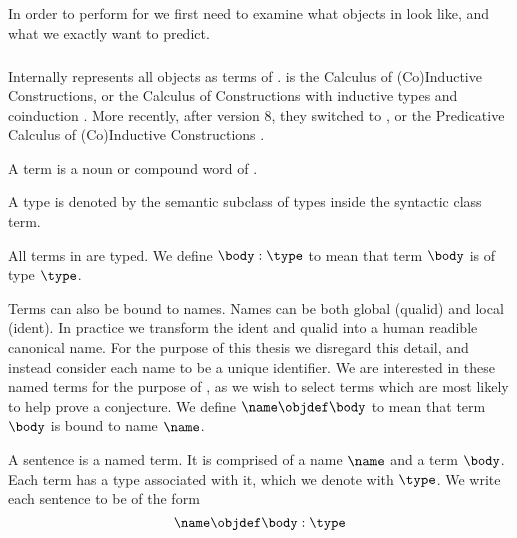 \subsection{\coq}

In order to perform \premiseselection for \coq we first need to examine what objects in \coq look like, and what we exactly want to predict.

\subsubsection{\pcic}

Internally \coq represents all objects as terms  of \cic {}.
\cic is the Calculus of (Co)Inductive Constructions,
or the Calculus of Constructions \cite{coquand1988calculus} with inductive types and coinduction \cite{huet1987induction} \cite{coquand1990inductively}.
More recently, after \coq version 8, they switched to \pcic {}, or the Predicative Calculus of (Co)Inductive Constructions \cite{bertot2013interactive}.

\begin{definition}[term]
	A term is a noun or compound word of \pcic.
\end{definition}
\begin{definition}[type]
	A type is denoted by the semantic subclass of types inside the syntactic class term.
\end{definition}

All terms in \coq are typed.
We define $\body : \type$ to mean that term $\body$ is of type $\type$.

Terms can also be bound to names.
Names can be both global (qualid) and local (ident).
In practice we transform the ident and qualid into a human readible canonical name.
For the purpose of this thesis we disregard this detail, and instead consider each name to be a unique identifier.
We are interested in these named terms for the purpose of \premiseselection, as we wish to select terms which are most likely to help prove a conjecture.
We define $\name \objdef \body$ to mean that term $\body$ is bound to name $\name$.

\begin{definition}[sentence]
	A sentence is a named term. It is comprised of a name $\name$ and a term $\body$. Each term has a type associated with it, which we denote with $\type$.
	We write each sentence to be of the form
	\[\name \objdef \body : \type\]
\end{definition}

